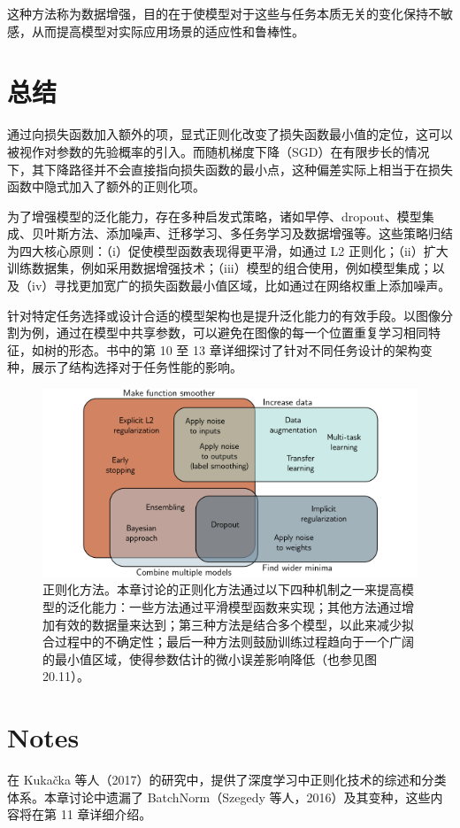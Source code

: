 这种方法称为数据增强，目的在于使模型对于这些与任务本质无关的变化保持不敏感，从而提高模型对实际应用场景的适应性和鲁棒性。

\section{总结}
通过向损失函数加入额外的项，显式正则化改变了损失函数最小值的定位，这可以被视作对参数的先验概率的引入。而随机梯度下降（SGD）在有限步长的情况下，其下降路径并不会直接指向损失函数的最小点，这种偏差实际上相当于在损失函数中隐式加入了额外的正则化项。

为了增强模型的泛化能力，存在多种启发式策略，诸如早停、dropout、模型集成、贝叶斯方法、添加噪声、迁移学习、多任务学习及数据增强等。这些策略归结为四大核心原则：（i）促使模型函数表现得更平滑，如通过 L2 正则化；（ii）扩大训练数据集，例如采用数据增强技术；（iii）模型的组合使用，例如模型集成；以及（iv）寻找更加宽广的损失函数最小值区域，比如通过在网络权重上添加噪声。

针对特定任务选择或设计合适的模型架构也是提升泛化能力的有效手段。以图像分割为例，通过在模型中共享参数，可以避免在图像的每一个位置重复学习相同特征，如树的形态。书中的第 10 至 13 章详细探讨了针对不同任务设计的架构变种，展示了结构选择对于任务性能的影响。

\begin{figure}[ht!]
	\centering
	\includegraphics[width=0.7\linewidth]{png/chapter9/RegMethods.png}
	\caption{正则化方法。本章讨论的正则化方法通过以下四种机制之一来提高模型的泛化能力：一些方法通过平滑模型函数来实现；其他方法通过增加有效的数据量来达到；第三种方法是结合多个模型，以此来减少拟合过程中的不确定性；最后一种方法则鼓励训练过程趋向于一个广阔的最小值区域，使得参数估计的微小误差影响降低（也参见图 20.11）。}
\end{figure}

\section{Notes}
在 Kukačka 等人（2017）的研究中，提供了深度学习中正则化技术的综述和分类体系。本章讨论中遗漏了 BatchNorm（Szegedy 等人，2016）及其变种，这些内容将在第 11 章详细介绍。

